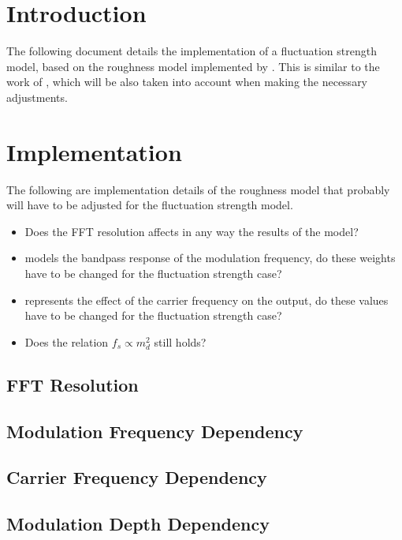 \documentclass[a4paper]{article}
\begin{document}

\section{Introduction}

The following document details the implementation of a fluctuation strength
model, based on the roughness model implemented by \citeauthor{Schrader2002}.
This is similar to the work of \citeauthor{Sontacchi1998}, which will be also
taken into account when making the necessary adjustments.

\section{Implementation}

The following are implementation details of the roughness model that probably
will have to be adjusted for the fluctuation strength model.

\begin{itemize}
    \item Does the FFT resolution affects in any way the results of the model?
    \item {} models the bandpass response of the modulation
        frequency, do these weights have to be changed for the fluctuation
        strength case?
    \item {} represents the effect of the carrier frequency on
        the output, do these values have to be changed for the fluctuation
        strength case?
    \item Does the relation $f_s \propto m_d ^ 2$ still holds?
\end{itemize}

\subsection{FFT Resolution}

\subsection{Modulation Frequency Dependency}

\subsection{Carrier Frequency Dependency}

\subsection{Modulation Depth Dependency}



\end{document}
